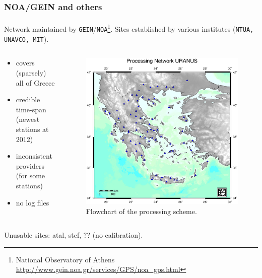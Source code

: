 \documentclass{beamer}
\begin{document}
\begin{frame}\frametitle{NOA/GEIN and others}\framesubtitle{}
  Network maintained by \texttt{GEIN}/\texttt{NOA}\footnote{National Observatory of Athens \url{http://www.gein.noa.gr/services/GPS/noa\_gps.html}}. Sites established by various institutes
  (\texttt{NTUA, UNAVCO, MIT}).
\begin{columns}[T] %
\begin{column}{.48\textwidth}
  \begin{itemize}
    \item<pro@1-> covers (sparsely) all of Greece 
    \item<pro@1-> credible time-span (newest stations at 2012)
    \item<con@1-> inconsistent providers (for some stations)
    \item<con@1-> no log files
  \end{itemize}
\end{column}%
\hfill%
\begin{column}{.68\textwidth}
 \begin{figure}
 \begin{center}
 \includegraphics[width=.5\textwidth]{img/uranusnet.eps}
 \caption{Flowchart of the processing scheme.}
 \label{fig:dgrm}
 \end{center}
 \end{figure}
\end{column}%
\end{columns}
  \begin{block}{}
    Unusable sites: atal, stef, ?? (no calibration).
  \end{block}
\end{frame}
\end{document}
